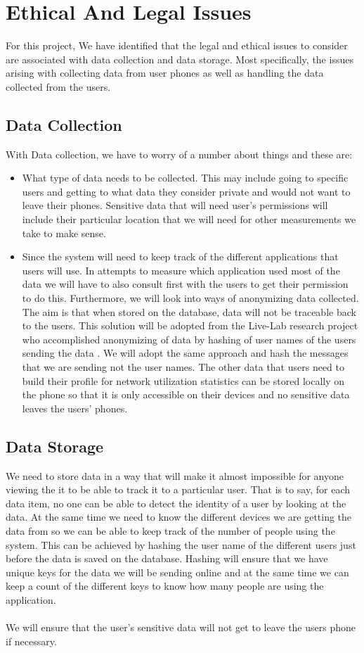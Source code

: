 \section{Ethical And Legal Issues}
For this project, We have identified that the legal and ethical issues to consider are associated with data collection and data storage. Most specifically, the issues arising with collecting data from user phones as well as handling the data collected from the users.

\subsection*{Data Collection}
With Data collection, we have to worry of a number about things and these are:
\begin{itemize}
	\item What type of data needs to be collected. This may include going to specific users and getting to what data they consider private and would not want to leave their phones. Sensitive data that will need user's permissions will include their particular location that we will need for other measurements we take to make sense. 
	\item Since the system will need to keep track of the different applications that users will use. In attempts to measure which application used most of the data we will have to also consult first with the users to get their permission to do this. Furthermore, we will look into ways of anonymizing data collected. The aim is that when stored on the database, data will not be traceable back to the users. This solution will be adopted from the Live-Lab research project who accomplished anonymizing of data by hashing of user names of the users sending the data \cite{Shepard:2011:LMW:1925019.1925023}. We will adopt the same approach  and hash the messages that we are sending not the user names. The other data that users need to build their profile for network utilization statistics can be stored locally on the phone so that it is only accessible on their devices and no sensitive data leaves the users' phones.
\end{itemize}
\subsection*{Data Storage}
 We need to store data in a way that will make it almost impossible for anyone viewing the it to be able to track it to a particular user. That is to say, for each data item, no one can be able to detect the identity of a user by looking at the data. At the same time we need to know the different devices we are getting the data from so we can be able to keep track of the number of people using the system. This can be achieved by hashing the user name of the different users just before the data is saved on the database. Hashing will ensure that we have unique keys for the data we will be sending online and at the same time we can keep a count of the different keys to know how many people are using the application.

\paragraph{}
We will ensure that the user's sensitive data will not get to leave the users phone if necessary. 
